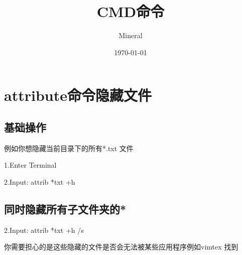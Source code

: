 \documentclass[utf8]{ctexart}
\author{Mineral}
\title{CMD命令}
\date {\today}
\begin{document}
		\maketitle
		\section{attribute命令隐藏文件}
		\subsection{基础操作}
		\par 例如你想隐藏当前目录下的所有*.txt 文件
		\par 1.Enter Terminal
		\par 2.Input: 	attrib *txt +h
		\subsection{同时隐藏所有子文件夹的*}
		\par 2.Input: 	attrib *txt +h /s
		\par 你需要担心的是这些隐藏的文件是否会无法被某些应用程序例如vimtex  找到		
\end{document}
